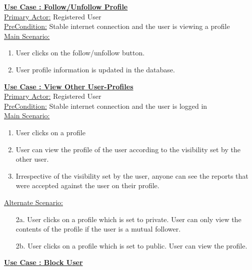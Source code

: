 \documentclass[conference,compsoc]{IEEEtran}
\newcounter{UC}
\newcommand{\nextU}{\stepcounter{UC}\theUC}
\begin{document}
\underline{\textbf{Use Case \nextU: Follow/Unfollow Profile}}\\

\underline{Primary Actor:} Registered User\\

\underline{PreCondition:} Stable internet connection and the user is viewing a profile\\

\underline{Main Scenario:}\\
\begin{enumerate}
    \item User clicks on the follow/unfollow button.
    \item User profile information is updated in the database.
\end{enumerate}

\underline{\textbf{Use Case \nextU: View Other User-Profiles}}\\

\underline{Primary Actor:} Registered User\\

\underline{PreCondition:} Stable internet connection and the user is logged in\\

\underline{Main Scenario:}\\
\begin{enumerate}
    \item User clicks on a profile
    \item User can view the profile of the user according to the visibility set by the other user.
    \item Irrespective of the visibility set by the user, anyone can see the reports that were accepted against the user on their profile.
\end{enumerate}

\underline{Alternate Scenario:}\\
\begin{enumerate}
    \item [2a.] User clicks on a profile which is set to private. User can only view the contents of the profile if the user is a mutual follower.
    \item [2b.] User clicks on a profile which is set to public. User can view the profile.
\end{enumerate}\vspace{0.2cm}

\underline{\textbf{Use Case \nextU: Block User}}\\
\end{document}
